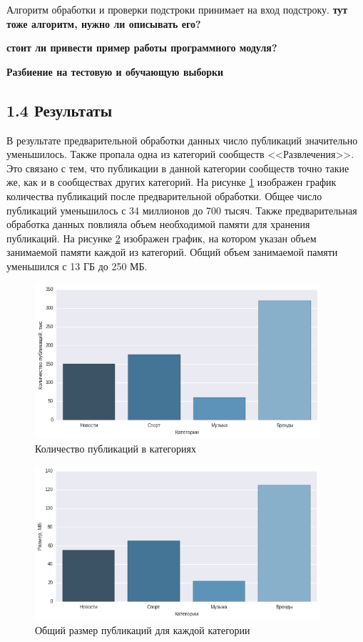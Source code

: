 \documentclass[a4paper]{report}
\begin{document}
	Алгоритм обработки и проверки подстроки принимает на вход подстроку. \textbf{тут тоже алгоритм, нужно ли описывать его?}
	
	\textbf{стоит ли привести пример работы программного модуля?}
	
	\textbf{Разбиение на тестовую и обучающую выборки}
	\newpage
	\subsection{1.4 Результаты} 
	
	В результате предварительной обработки данных число публикаций значительно уменьшилось. Также пропала одна из категорий сообществ <<Развлечения>>. Это связано с тем, что публикации в данной категории сообществ точно такие же, как и в сообществах других категорий. На рисунке \ref{fig:numart1} изображен график количества публикаций после предварительной обработки. Общее число публикаций уменьшилось с 34 миллионов до 700 тысяч. Также предварительная обработка данных повлияла объем необходимой памяти для хранения публикаций. На рисунке \ref{fig:sizecat1} изображен график, на котором указан объем занимаемой памяти каждой из категорий. Общий объем занимаемой памяти уменьшился с 13 ГБ до 250 МБ.
	
	
	\begin{figure}
		\centering
		\includegraphics[width=400px]
		{imgs/NumArticles1.png}
		\caption{Количество публикаций в категориях}
		\label{fig:numart1}
	\end{figure} 
	


	\begin{figure}
		\centering
		\includegraphics[width=400px]
		{imgs/SizeCat1.png}
		\caption{Общий размер публикаций для каждой категории}
		\label{fig:sizecat1}
	\end{figure} 
	
\end{document}
